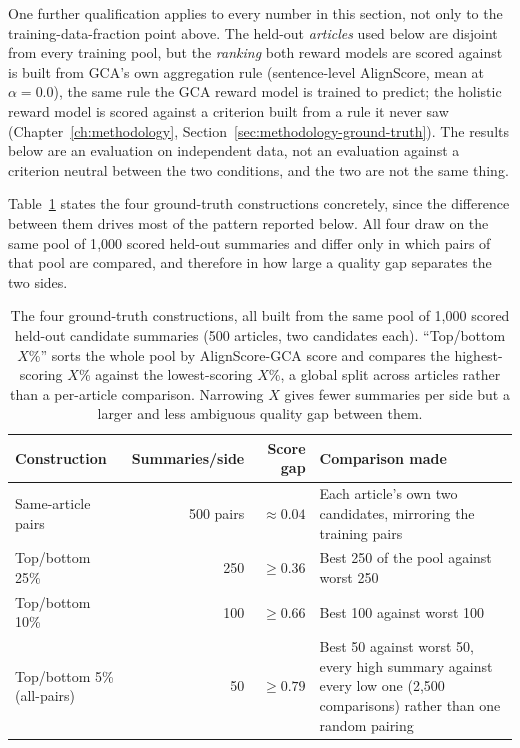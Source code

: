 One further qualification applies to every number in this section, not only
to the training-data-fraction point above. The held-out \emph{articles} used
below are disjoint from every training pool, but the \emph{ranking} both
reward models are scored against is built from GCA's own aggregation rule
(sentence-level AlignScore, mean at $\alpha=0.0$), the same rule the GCA
reward model is trained to predict; the holistic reward model is scored
against a criterion built from a rule it never saw
(Chapter~\ref{ch:methodology}, Section~\ref{sec:methodology-ground-truth}).
The results below are an evaluation on independent data, not an evaluation
against a criterion neutral between the two conditions, and the two are not
the same thing.

Table~\ref{tab:gt-constructions} states the four ground-truth constructions
concretely, since the difference between them drives most of the pattern
reported below. All four draw on the same pool of 1{,}000 scored held-out
summaries and differ only in which pairs of that pool are compared, and
therefore in how large a quality gap separates the two sides.

\begin{table}[htbp]
\centering
\caption[The four ground-truth constructions]{The four ground-truth constructions, all built from the same pool
of 1{,}000 scored held-out candidate summaries (500 articles, two candidates
each). ``Top/bottom $X$\%'' sorts the whole pool by AlignScore-GCA score and
compares the highest-scoring $X$\% against the lowest-scoring $X$\%, a global
split across articles rather than a per-article comparison. Narrowing $X$
gives fewer summaries per side but a larger and less ambiguous quality gap
between them.}
\label{tab:gt-constructions}
\begin{tabularx}{\textwidth}{lrrX}
\toprule
Construction & Summaries/side & Score gap & Comparison made \\
\midrule
Same-article pairs & 500 pairs & $\approx0.04$ &
  Each article's own two candidates, mirroring the training pairs \\
Top/bottom 25\% & 250 & $\geq0.36$ &
  Best 250 of the pool against worst 250 \\
Top/bottom 10\% & 100 & $\geq0.66$ &
  Best 100 against worst 100 \\
Top/bottom 5\% (all-pairs) & 50 & $\geq0.79$ &
  Best 50 against worst 50, every high summary against every low one
  (2{,}500 comparisons) rather than one random pairing \\
\bottomrule
\end{tabularx}
\end{table}

